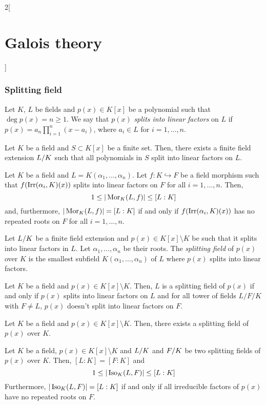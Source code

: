 \documentclass[../../../main.tex]{subfiles}
\begin{document}
\begin{multicols}{2}[\section{Galois theory}]
  \subsubsection{Splitting field}
  \begin{definition}
    Let $K$, $L$ be fields and $p(x)\in K[x]$ be a polynomial such that $\deg p(x)=n\geq 1$. We say that $p(x)$ \emph{splits into linear factors} on $L$ if $p(x)=a_n\prod_{i=1}^n(x-a_i)$, where $a_i\in L$ for $i=1,\ldots,n$.
  \end{definition}
  \begin{theorem}
    Let $K$ be a field and $S\subset K[x]$ be a finite set. Then, there exists a finite field extension $\quot{L}{K}$ such that all polynomials in $S$ split into linear factors on $L$.
  \end{theorem}
  \begin{theorem}
    Let $K$ be a field and $L=K(\alpha_1,\ldots,\alpha_n)$. Let $f:K\hookrightarrow F$ be a field morphism such that $f(\operatorname{Irr}(\alpha_i,K)(x))$ splits into linear factors on $F$ for all $i=1,\ldots,n$. Then, $$1\leq|\operatorname{Mor}_K(L,f)|\leq [L:K]$$ and, furthermore, $|\operatorname{Mor}_K(L,f)|=[L:K]$ if and only if $f(\operatorname{Irr}(\alpha_i,K)(x))$ has no repeated roots on $F$ for all $i=1,\ldots,n$.
  \end{theorem}
  \begin{definition}
    Let $\quot{L}{K}$ be a finite field extension and $p(x)\in K[x]\setminus K$ be such that it splits into linear factors in $L$. Let $\alpha_1,\ldots,\alpha_n$ be their roots. The \emph{splitting field} of $p(x)$ over $K$ is the smallest subfield $K(\alpha_1,\ldots,\alpha_n)$ of $L$ where $p(x)$ splits into linear factors.
  \end{definition}
  \begin{prop}
    Let $K$ be a field and $p(x)\in K[x]\setminus K$. Then, $L$ is a splitting field of $p(x)$ if and only if $p(x)$ splits into linear factors on $L$ and for all tower of fields $L/F/K$ with $F\ne L$, $p(x)$ doesn't split into linear factors on $F$.
  \end{prop}
  \begin{theorem}
    Let $K$ be a field and $p(x)\in K[x]\setminus K$. Then, there exists a splitting field of $p(x)$ over $K$.
  \end{theorem}
  \begin{theorem}
    Let $K$ be a field, $p(x)\in K[x]\setminus K$ and $\quot{L}{K}$ and $\quot{F}{K}$ be two splitting fields of $p(x)$ over $K$. Then, $[L:K]=[F:K]$ and $$1\leq|\operatorname{Iso}_K(L,F)|\leq [L:K]$$ Furthermore, $|\operatorname{Iso}_K(L,F)|=[L:K]$ if and only if all irreducible factors of $p(x)$ have no repeated roots on $F$.

\end{theorem}
\end{multicols}
\end{document}
